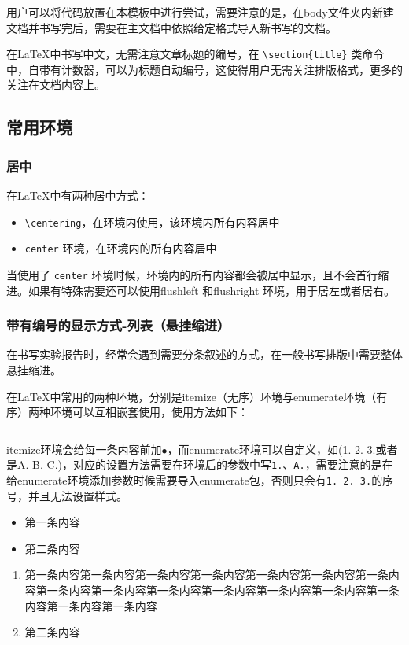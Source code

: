 \inputminted[linenos,frame=lines]{latex}{code/itemize.tex}


用户可以将代码放置在本模板中进行尝试，需要注意的是，在body文件夹内新建文档并书写完后，需要在主文档中依照给定格式导入新书写的文档。

在\LaTeX 中书写中文，无需注意文章标题的编号，在 \verb|\section{title}| 类命令中，自带有计数器，可以为标题自动编号，这使得用户无需关注排版格式，更多的关注在文档内容上。
\subsection{常用环境}
\subsubsection{居中}
在\LaTeX 中有两种居中方式：
\begin{itemize}
\item \verb|\centering|，在环境内使用，该环境内所有内容居中
\item \verb|center| 环境，在环境内的所有内容居中
\end{itemize}
\begin{center}
当使用了 \verb|center| 环境时候，环境内的所有内容都会被居中显示，且不会首行缩进。如果有特殊需要还可以使用flushleft 和flushright 环境，用于居左或者居右。
\end{center}
\subsubsection{带有编号的显示方式-列表（悬挂缩进）}
在书写实验报告时，经常会遇到需要分条叙述的方式，在一般书写排版中需要整体悬挂缩进。

在\LaTeX 中常用的两种环境，分别是itemize（无序）环境与enumerate环境（有序）两种环境可以互相嵌套使用，使用方法如下：

\inputminted[linenos,frame=lines]{latex}{code/itemize.tex}

itemize环境会给每一条内容前加$\bullet$，而enumerate环境可以自定义，如(1. 2. 3.或者是A. B. C.)，对应的设置方法需要在环境后的参数中写\verb|1.|、\verb|A.|，需要注意的是在给enumerate环境添加参数时候需要导入enumerate包，否则只会有\verb|1. 2. 3.|的序号，并且无法设置样式。
\begin{itemize}
\item 第一条内容
\item 第二条内容
\end{itemize}
\begin{enumerate}[aa.]
\item 第一条内容第一条内容第一条内容第一条内容第一条内容第一条内容第一条内容第一条内容第一条内容第一条内容第一条内容第一条内容第一条内容第一条内容第一条内容第一条内容
\item 第二条内容
\end{enumerate}
